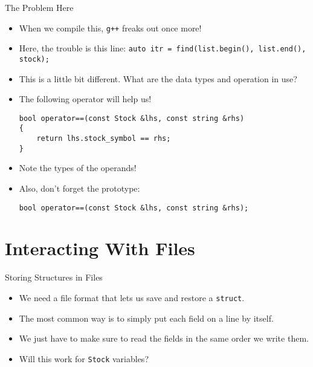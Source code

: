 \documentclass[]{beamer}
\begin{document}
\begin{frame}[fragile]{The Problem Here}
    \begin{itemize}[<+->]
        \item When we compile this, \texttt{g++} freaks out once more!
        \item Here, the trouble is this line:
            \newline\verb!auto itr = find(list.begin(), list.end(), stock);!
        \item This is a little bit different.  What are the data types
            and operation in use?
        \item The following operator will help us!
        \begin{adjustbox}{max width=0.9\textwidth}
        \begin{BVerbatim}
bool operator==(const Stock &lhs, const string &rhs)
{
    return lhs.stock_symbol == rhs;
}
        \end{BVerbatim}
        \end{adjustbox}
        \item Note the types of the operands!
        \item Also, don't forget the prototype:
        \begin{adjustbox}{max width=0.9\textwidth}
        \begin{BVerbatim}
bool operator==(const Stock &lhs, const string &rhs);
        \end{BVerbatim}
        \end{adjustbox}
    \end{itemize}
\end{frame}


\section{Interacting With Files}
\begin{frame}{Storing Structures in Files}
    \begin{itemize}[<+->]
        \item We need a file format that lets us save and restore
            a \texttt{struct}.
        \item The most common way is to simply put each field on
            a line by itself.
        \item We just have to make sure to read the fields in the same
            order we write them.
        \item Will this work for \texttt{Stock} variables?
    \end{itemize}
\end{frame}
\end{document}
